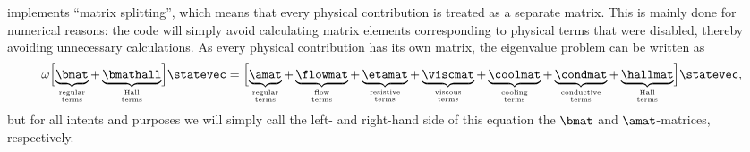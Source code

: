 {\legolas} implements ``matrix splitting'', which means that every physical contribution is treated as a separate matrix. This is mainly done for numerical reasons: the code will simply avoid calculating matrix elements corresponding to physical terms that were disabled, thereby avoiding unnecessary calculations. As every physical contribution has its own matrix, the eigenvalue problem can be written as
\begin{equation} \label{eq: matrix_splitting}
	\omega \Bigl[
	\underbrace{\bmat}_{\substack{\text{\tiny regular} \\ \text{\tiny terms}}}
	+ \underbrace{\bmathall}_{\substack{\text{\tiny Hall} \\ \text{\tiny terms}}}
	\Bigr]\statevec
	= \Bigl[
		\underbrace{\amat}_{\substack{\text{\tiny regular} \\ \text{\tiny terms}}}
		+ \underbrace{\flowmat}_{\substack{\text{\tiny flow} \\ \text{\tiny terms}}}
		+ \underbrace{\etamat}_{\substack{\text{\tiny resistive} \\ \text{\tiny terms}}}
		+ \underbrace{\viscmat}_{\substack{\text{\tiny viscous} \\ \text{\tiny terms}}}
		+ \underbrace{\coolmat}_{\substack{\text{\tiny cooling} \\ \text{\tiny terms}}}
		+ \underbrace{\condmat}_{\substack{\text{\tiny conductive} \\ \text{\tiny terms}}}
		+ \underbrace{\hallmat}_{\substack{\text{\tiny Hall} \\ \text{\tiny terms}}}
	\Bigr]\statevec,
\end{equation}
but for all intents and purposes we will simply call the left- and right-hand side of this equation the $\bmat$ and $\amat$-matrices, respectively.


